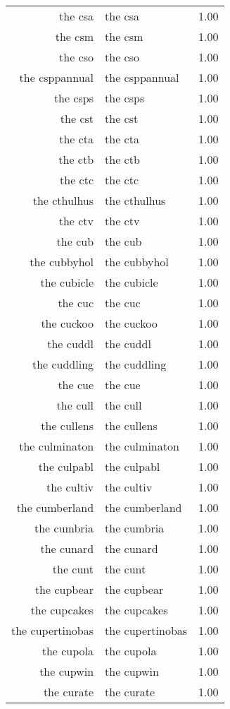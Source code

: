 \begin{table}[ht]
\begin{tabular}{rlr}
  the csa & the csa & 1.00 \\ 
  the csm & the csm & 1.00 \\ 
  the cso & the cso & 1.00 \\ 
  the csppannual & the csppannual & 1.00 \\ 
  the csps & the csps & 1.00 \\ 
  the cst & the cst & 1.00 \\ 
  the cta & the cta & 1.00 \\ 
  the ctb & the ctb & 1.00 \\ 
  the ctc & the ctc & 1.00 \\ 
  the cthulhus & the cthulhus & 1.00 \\ 
  the ctv & the ctv & 1.00 \\ 
  the cub & the cub & 1.00 \\ 
  the cubbyhol & the cubbyhol & 1.00 \\ 
  the cubicle & the cubicle & 1.00 \\ 
  the cuc & the cuc & 1.00 \\ 
  the cuckoo & the cuckoo & 1.00 \\ 
  the cuddl & the cuddl & 1.00 \\ 
  the cuddling & the cuddling & 1.00 \\ 
  the cue & the cue & 1.00 \\ 
  the cull & the cull & 1.00 \\ 
  the cullens & the cullens & 1.00 \\ 
  the culminaton & the culminaton & 1.00 \\ 
  the culpabl & the culpabl & 1.00 \\ 
  the cultiv & the cultiv & 1.00 \\ 
  the cumberland & the cumberland & 1.00 \\ 
  the cumbria & the cumbria & 1.00 \\ 
  the cunard & the cunard & 1.00 \\ 
  the cunt & the cunt & 1.00 \\ 
  the cupbear & the cupbear & 1.00 \\ 
  the cupcakes & the cupcakes & 1.00 \\ 
  the cupertinobas & the cupertinobas & 1.00 \\ 
  the cupola & the cupola & 1.00 \\ 
  the cupwin & the cupwin & 1.00 \\ 
  the curate & the curate & 1.00 \\ 

\end{tabular}
\end{table}
